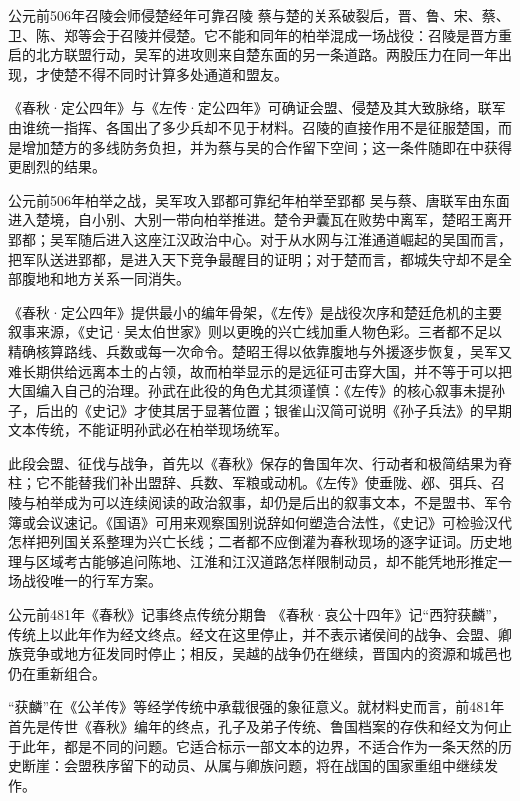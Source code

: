 \begin{event}{公元前506年}{召陵会师侵楚}{经年可靠}{召陵}
蔡与楚的关系破裂后，晋、鲁、宋、蔡、卫、陈、郑等会于召陵并侵楚。它不能和同年的柏举混成一场战役：召陵是晋方重启的北方联盟行动，吴军的进攻则来自楚东面的另一条道路。两股压力在同一年出现，才使楚不得不同时计算多处通道和盟友。

《春秋·定公四年》与《左传·定公四年》可确证会盟、侵楚及其大致脉络，联军由谁统一指挥、各国出了多少兵却不见于材料。召陵的直接作用不是征服楚国，而是增加楚方的多线防务负担，并为蔡与吴的合作留下空间；这一条件随即在中获得更剧烈的结果。
\end{event}

\begin{event}{公元前506年}{柏举之战，吴军攻入郢都}{可靠纪年}{柏举至郢都}
吴与蔡、唐联军由东面进入楚境，自小别、大别一带向柏举推进。楚令尹囊瓦在败势中离军，楚昭王离开郢都；吴军随后进入这座江汉政治中心。对于从水网与江淮通道崛起的吴国而言，把军队送进郢都，是进入天下竞争最醒目的证明；对于楚而言，都城失守却不是全部腹地和地方关系一同消失。

《春秋·定公四年》提供最小的编年骨架，《左传》是战役次序和楚廷危机的主要叙事来源，《史记·吴太伯世家》则以更晚的兴亡线加重人物色彩。三者都不足以精确核算路线、兵数或每一次命令。楚昭王得以依靠腹地与外援逐步恢复，吴军又难长期供给远离本土的占领，故而柏举显示的是远征可击穿大国，并不等于可以把大国编入自己的治理。孙武在此役的角色尤其须谨慎：《左传》的核心叙事未提孙子，后出的《史记》才使其居于显著位置；银雀山汉简可说明《孙子兵法》的早期文本传统，不能证明孙武必在柏举现场统军。
\end{event}

\begin{sourcenote}
此段会盟、征伐与战争，首先以《春秋》保存的鲁国年次、行动者和极简结果为脊柱；它不能替我们补出盟辞、兵数、军粮或动机。《左传》使垂陇、邲、弭兵、召陵与柏举成为可以连续阅读的政治叙事，却仍是后出的叙事文本，不是盟书、军令簿或会议速记。《国语》可用来观察国别说辞如何塑造合法性，《史记》可检验汉代怎样把列国关系整理为兴亡长线；二者都不应倒灌为春秋现场的逐字证词。历史地理与区域考古能够追问陈地、江淮和江汉道路怎样限制动员，却不能凭地形推定一场战役唯一的行军方案。
\end{sourcenote}

\begin{event}{公元前481年}{《春秋》记事终点}{传统分期}{鲁}
《春秋·哀公十四年》记“西狩获麟”，传统上以此年作为经文终点。经文在这里停止，并不表示诸侯间的战争、会盟、卿族竞争或地方征发同时停止；相反，吴越的战争仍在继续，晋国内的资源和城邑也仍在重新组合。

“获麟”在《公羊传》等经学传统中承载很强的象征意义。就材料史而言，前481年首先是传世《春秋》编年的终点，孔子及弟子传统、鲁国档案的存佚和经文为何止于此年，都是不同的问题。它适合标示一部文本的边界，不适合作为一条天然的历史断崖：会盟秩序留下的动员、从属与卿族问题，将在战国的国家重组中继续发作。
\end{event}

